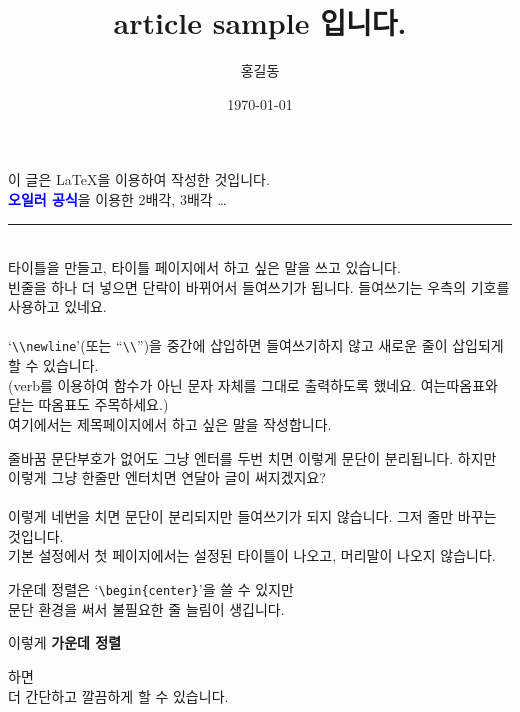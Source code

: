 \documentclass{article} %
\title{article sample 입니다.} %
\author{홍길동} %
\date{\today} %
\begin{document}
\maketitle %

이 글은 \LaTeX{}을 이용하여 작성한 것입니다. \\

\textbf{\textcolor{blue}{오일러 공식}}을 이용한 2배각, 3배각 \dots\\ %
\rule{\linewidth}{1pt}\\ %

타이틀을 만들고, 타이틀 페이지에서 하고 싶은 말을 쓰고 있습니다.\\
빈줄을 하나 더 넣으면 단락이 바뀌어서 들여쓰기가 됩니다. 들여쓰기는 우측의 기호를 사용하고 있네요. \\
\\
`\verb|\\newline|'(또는 ``\verb|\\|'')을 중간에 삽입하면 들여쓰기하지 않고 새로운 줄이 삽입되게 할 수 있습니다. \\
(verb를 이용하여 함수가 아닌 문자 자체를 그대로 출력하도록 했네요. 여는따옴표와 닫는 따옴표도 주목하세요.) \\

여기에서는 제목페이지에서 하고 싶은 말을 작성합니다.

줄바꿈 문단부호가 없어도 그냥 엔터를 두번 치면 이렇게 문단이 분리됩니다.
하지만 이렇게 그냥 한줄만 엔터치면
연달아 글이 써지겠지요? \\\\
이렇게 네번을 치면 문단이 분리되지만 들여쓰기가 되지 않습니다. 그저 줄만 바꾸는 것입니다.\\
\vspace{2\baselineskip} %
\vspace{5pt} %
기본 설정에서 첫 페이지에서는 설정된 타이틀이 나오고, 머리말이 나오지 않습니다.\\

\begin{center} %
가운데 정렬은 `\verb|\begin{center}|'을 쓸 수 있지만\\
문단 환경을 써서 불필요한 줄 늘림이 생깁니다.
\end{center}
{\centering 이렇게 \Large \textbf{가운데 정렬} \par {} 하면 \\ %
더 간단하고 깔끔하게 할 수 있습니다.\par}
\end{document}
